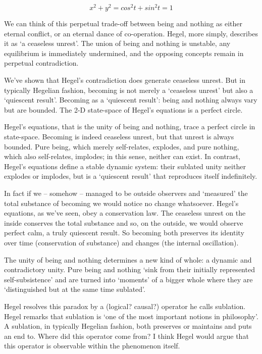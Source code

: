 \documentclass[
]{book}
\begin{document}
\[x^{2} + y^{2} = cos^{2}t + sin^{2}t = 1\]

We can think of this perpetual trade-off between being and nothing as either eternal conflict, or an eternal dance of co-operation. Hegel, more simply, describes it as `a ceaseless unrest'. The union of being and nothing is unstable, any equilibrium is immediately undermined, and the opposing concepts remain in perpetual contradiction.

We've shown that Hegel's contradiction does generate ceaseless unrest. But in typically Hegelian fashion, becoming is not merely a `ceaseless unrest' but also a `quiescent result'.
Becoming as a `quiescent result': being and nothing always vary but are bounded. The 2-D state-space of Hegel's equations is a perfect circle.

Hegel's equations, that is the unity of being and nothing, trace a perfect circle in state-space. Becoming is indeed ceaseless unrest, but that unrest is always bounded. Pure being, which merely self-relates, explodes, and pure nothing, which also self-relates, implodes; in this sense, neither can exist. In contrast, Hegel's equations define a stable dynamic system: their sublated unity neither explodes or implodes, but is a `quiescent result' that reproduces itself indefinitely.

In fact if we -- somehow -- managed to be outside observers and `measured' the total substance of becoming we would notice no change whatsoever. Hegel's equations, as we've seen, obey a conservation law. The ceaseless unrest on the inside conserves the total substance and so, on the outside, we would observe perfect calm, a truly quiescent result. So becoming both preserves its identity over time (conservation of substance) and changes (the internal oscillation).

The unity of being and nothing determines a new kind of whole: a dynamic and contradictory unity. Pure being and nothing `sink from their initially represented self-subsistence' and are turned into `moments' of a bigger whole where they are `distinguished but at the same time sublated'.

Hegel resolves this paradox by a (logical? causal?) operator he calls sublation. Hegel remarks that sublation is `one of the most important notions in philosophy'. A sublation, in typically Hegelian fashion, both preserves or maintains and puts an end to. Where did this operator come from? I think Hegel would argue that this operator is observable within the phenomenon itself.
\end{document}
